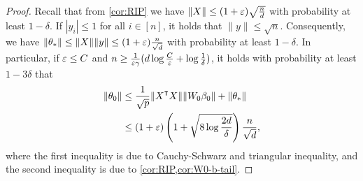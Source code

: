 \begin{proof}
    Recall that from \cref{cor:RIP} we have $\|X\|\leq (1+\varepsilon)\sqrt{\frac{n}{d}}$ with probability at least $1-\delta$. If $|y_i|\leq 1$ for all $i\in[n]$, it holds that $\|y\|\leq \sqrt{n}$. Consequently, we have $\|\theta_*\| \leq \|X\|\|y\| \leq (1+\varepsilon)\frac{n}{\sqrt{d}}$ with probability at least $1-\delta$. In particular, if $\varepsilon \leq C$ and $n \geq \frac{1}{\varepsilon\gamma} (d\log\frac{C}{\varepsilon} + \log\frac{1}{\delta})$, it holds with probability at least $1-3\delta$ that
    \begin{align*}
        \|\theta_0\| & \leq \frac{1}{\sqrt{p}}\|X\transpose X\|\|W_0 \beta_0\| + \|\theta_*\| \\
        & \leq (1+\eps)\left(1 + \sqrt{8\log\frac{2d}{\delta}}\right)\frac{n}{\sqrt{d}},
    \end{align*}
    where the first inequality is due to Cauchy-Schwarz and triangular inequality, and the second inequality is due to \cref{cor:RIP,cor:W0-b-tail}.
\end{proof}